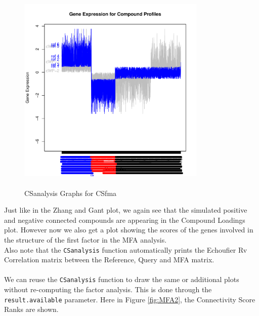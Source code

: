 \documentclass[a4paper]{article}\usepackage[]{graphicx}\usepackage[]{color}
\newenvironment{knitrout}{}{} %
\begin{document}
\begin{knitrout}
\begin{figure}[H]
\includegraphics[width=9cm,height=10cm]{figure/MFA-4} \hfill{}

\caption[CSanalysis Graphs for CSfma]{CSanalysis Graphs for CSfma\label{fig:MFA}}
\end{figure}


\end{knitrout}

\noindent Just like in the Zhang and Gant plot, we again see that the simulated
positive and negative connected compounds are appearing in the Compound Loadings
plot. However now we also get a plot showing the scores of the genes involved in
the structure of the first factor in the MFA analysis.\\
Also note that the \texttt{CSanalysis} function automatically prints the
Echoufier Rv Correlation matrix between the Reference, Query and MFA matrix.
\\ \\
We can reuse the \texttt{CSanalysis} function to draw the same or additional
plots without re-computing the factor analysis. This is done through the
\texttt{result.available} parameter. Here in Figure \ref{fig:MFA2}, the
Connectivity Score Ranks are shown.
\end{document}
